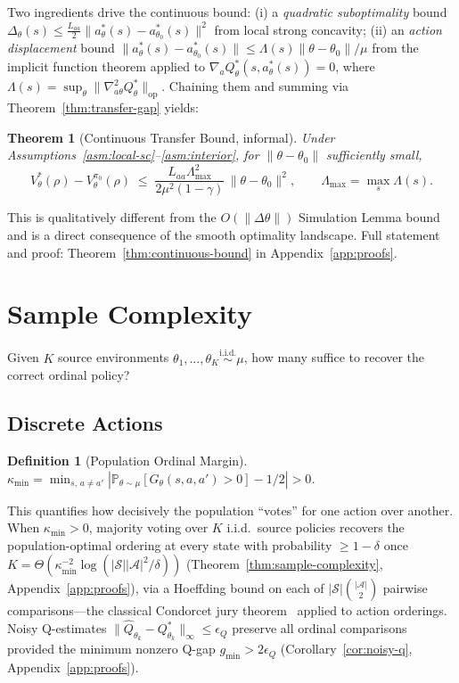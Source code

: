 \documentclass{article}
\newtheorem{definition}{Definition}
\newtheorem{theorem}{Theorem}
\newcommand{\Prob}{\mathbb{P}}
\newcommand{\cS}{\mathcal{S}}
\newcommand{\cA}{\mathcal{A}}
\begin{document}
Two ingredients drive the continuous bound: (i) a \emph{quadratic suboptimality} bound $\Delta_\theta(s) \leq \tfrac{L_{aa}}{2}\|a^*_\theta(s) - a^*_{\theta_0}(s)\|^2$ from local strong concavity; (ii) an \emph{action displacement} bound $\|a^*_\theta(s) - a^*_{\theta_0}(s)\| \leq \Lambda(s)\|\theta - \theta_0\|/\mu$ from the implicit function theorem applied to $\nabla_a Q^*_\theta(s, a^*_\theta(s)) = 0$, where $\Lambda(s) = \sup_\theta\|\nabla^2_{a\theta}Q^*_\theta\|_{\mathrm{op}}$. Chaining them and summing via Theorem~\ref{thm:transfer-gap} yields:

\begin{theorem}[Continuous Transfer Bound, informal]
\label{thm:continuous-bound-main}
Under Assumptions~\ref{asm:local-sc}--\ref{asm:interior}, for $\|\theta-\theta_0\|$ sufficiently small,
\[
V^*_\theta(\rho) - V^{\pi_0}_\theta(\rho) \;\leq\; \frac{L_{aa}\Lambda_{\max}^2}{2\mu^2(1-\gamma)}\,\|\theta-\theta_0\|^2, \qquad \Lambda_{\max} = \max_s \Lambda(s).
\]
\end{theorem}

This is qualitatively different from the $O(\|\Delta\theta\|)$ Simulation Lemma bound and is a direct consequence of the smooth optimality landscape. Full statement and proof: Theorem~\ref{thm:continuous-bound} in Appendix~\ref{app:proofs}.

\section{Sample Complexity}
\label{sec:sample-complexity}

Given $K$ source environments $\theta_1, \ldots, \theta_K \overset{\text{i.i.d.}}{\sim} \mu$, how many suffice to recover the correct ordinal policy?

\subsection{Discrete Actions}
\label{sec:sample-complexity-discrete}

\begin{definition}[Population Ordinal Margin]
\label{def:pop-margin}
$\kappa_{\min} = \min_{s,\,a \neq a'}|\Prob_{\theta \sim \mu}[G_\theta(s,a,a')>0] - 1/2| > 0$.
\end{definition}

This quantifies how decisively the population ``votes'' for one action over another. When $\kappa_{\min} > 0$, majority voting over $K$ i.i.d.\ source policies recovers the population-optimal ordering at every state with probability $\geq 1 - \delta$ once $K = \Theta(\kappa_{\min}^{-2}\log(|\cS||\cA|^2/\delta))$ (Theorem~\ref{thm:sample-complexity}, Appendix~\ref{app:proofs}), via a Hoeffding bound on each of $|\cS|\binom{|\cA|}{2}$ pairwise comparisons---the classical Condorcet jury theorem~\citep{young1988condorcet} applied to action orderings. Noisy Q-estimates $\|\hat{Q}_{\theta_k} - Q^*_{\theta_k}\|_\infty \leq \epsilon_Q$ preserve all ordinal comparisons provided the minimum nonzero Q-gap $g_{\min} > 2\epsilon_Q$ (Corollary~\ref{cor:noisy-q}, Appendix~\ref{app:proofs}).
\end{document}
